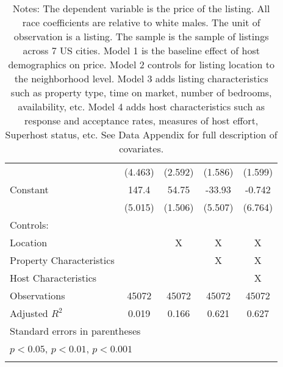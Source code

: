 {\begin{longtable}{l*{4}{c}}
                    &     (4.463)         &     (2.592)         &     (1.586)         &     (1.599)         \\
[1em]
Constant            &       147.4\sym{***}&       54.75\sym{***}&      -33.93\sym{***}&      -0.742         \\
                    &     (5.015)         &     (1.506)         &     (5.507)         &     (6.764)         \\
\hline
Controls:        \\
\hspace{3mm} Location  &                &       X         &       X         &       X         \\
\hspace{3mm} Property Characteristics  &                &                &       X         &       X         \\
\hspace{3mm} Host Characteristics  &                &                &                &       X         \\
\hline
Observations        &       45072         &       45072         &       45072         &       45072         \\
Adjusted \(R^{2}\)  &       0.019         &       0.166         &       0.621         &       0.627         \\
\hline\hline
\multicolumn{5}{l}{\footnotesize Standard errors in parentheses}\\
\multicolumn{5}{l}{\footnotesize \sym{*} \(p<0.05\), \sym{**} \(p<0.01\), \sym{***} \(p<0.001\)}\\
\caption*{Notes: The dependent variable is the price of the listing. All race coefficients are relative to white males. The unit of observation is a listing. The sample is the sample of listings across 7 US cities. Model 1 is the baseline effect of host demographics on price. Model 2 controls for listing location to the neighborhood level. Model 3 adds listing characteristics such as property type, time on market, number of bedrooms, availability, etc. Model 4 adds host characteristics such as response and acceptance rates, measures of host effort, Superhost status, etc. See Data Appendix for full description of covariates.}
\label{Table 4}


\end{longtable}
}


\begin{comment}
[1em]
Middle-aged         &       12.21\sym{***}&       10.62\sym{***}&       1.724         &       1.702         \\
&     (2.126)         &     (1.281)         &     (0.913)         &     (0.907)         \\
[1em]
Old ($>$ 65)           &       8.145         &       3.664         &      -1.752         &      -2.239         \\
&     (5.936)         &     (5.339)         &     (3.271)         &     (3.237)         \\
	
\end{comment}
